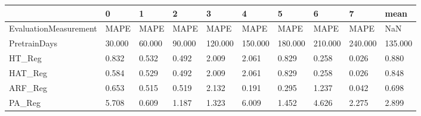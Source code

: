 \begin{tabular}{llllllllll}
\toprule
{} &      0 &      1 &      2 &       3 &       4 &       5 &       6 &       7 &    mean \\
\midrule
EvaluationMeasurement &   MAPE &   MAPE &   MAPE &    MAPE &    MAPE &    MAPE &    MAPE &    MAPE &     NaN \\
PretrainDays          & 30.000 & 60.000 & 90.000 & 120.000 & 150.000 & 180.000 & 210.000 & 240.000 & 135.000 \\
HT\_Reg                &  0.832 &  0.532 &  0.492 &   2.009 &   2.061 &   0.829 &   0.258 &   0.026 &   0.880 \\
HAT\_Reg               &  0.584 &  0.529 &  0.492 &   2.009 &   2.061 &   0.829 &   0.258 &   0.026 &   0.848 \\
ARF\_Reg               &  0.653 &  0.515 &  0.519 &   2.132 &   0.191 &   0.295 &   1.237 &   0.042 &   0.698 \\
PA\_Reg                &  5.708 &  0.609 &  1.187 &   1.323 &   6.009 &   1.452 &   4.626 &   2.275 &   2.899 \\
\bottomrule
\end{tabular}
